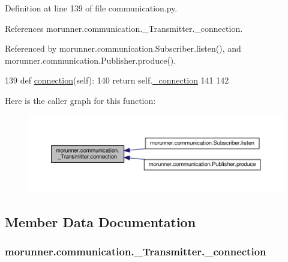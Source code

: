 Definition at line 139 of file communication.\+py.



References morunner.\+communication.\+\_\+\+Transmitter.\+\_\+connection.



Referenced by morunner.\+communication.\+Subscriber.\+listen(), and morunner.\+communication.\+Publisher.\+produce().


\begin{DoxyCode}
139     \textcolor{keyword}{def }\hyperlink{classmorunner_1_1communication_1_1__Transmitter_a054317d3dbeecd42d6bbb81612d67ea5}{connection}(self):
140         \textcolor{keywordflow}{return} self.\hyperlink{classmorunner_1_1communication_1_1__Transmitter_a759fb3f16daa3686e84a775f6cb8e60d}{\_connection}
141 
142 
\end{DoxyCode}


Here is the caller graph for this function\+:
\nopagebreak
\begin{figure}[H]
\begin{center}
\leavevmode
\includegraphics[width=350pt]{classmorunner_1_1communication_1_1__Transmitter_a054317d3dbeecd42d6bbb81612d67ea5_icgraph}
\end{center}
\end{figure}




\subsection{Member Data Documentation}
\hypertarget{classmorunner_1_1communication_1_1__Transmitter_a759fb3f16daa3686e84a775f6cb8e60d}{}
\subsubsection[{\+\_\+connection}]{\setlength{\rightskip}{0pt plus 5cm}morunner.\+communication.\+\_\+\+Transmitter.\+\_\+connection\hspace{0.3cm}{\ttfamily [private]}}\label{classmorunner_1_1communication_1_1__Transmitter_a759fb3f16daa3686e84a775f6cb8e60d}


